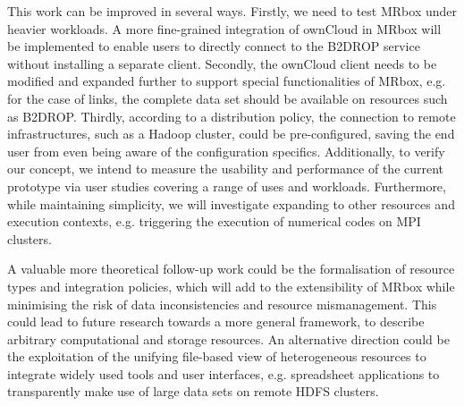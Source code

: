 This work can be improved in several ways. Firstly, we need to test MRbox under heavier workloads. A more fine-grained integration of ownCloud in MRbox will be implemented to enable users to directly connect to the B2DROP service without installing a separate client. Secondly, the ownCloud client needs to be modified and expanded further to support special functionalities of MRbox, e.g. for the case of links, the complete data set should be available on resources such as B2DROP. Thirdly, according to a distribution policy, the connection to remote infrastructures, such as a Hadoop cluster, could be pre-configured, saving the end user from even being aware of the configuration specifics. Additionally, to verify our concept, we intend to measure the usability and performance of the current prototype via user studies covering a range of uses and workloads. Furthermore, while maintaining simplicity, we will investigate expanding to other resources and execution contexts, e.g. triggering the execution of numerical codes on MPI clusters. 

A valuable more theoretical follow-up work could be the formalisation of resource types and integration policies, which will add to the extensibility of MRbox while minimising the risk of data inconsistencies and resource mismanagement. This could lead to future research towards a more general framework, to describe arbitrary computational and storage resources. An alternative direction could be the exploitation of the unifying file-based view of heterogeneous resources to integrate widely used tools and user interfaces, e.g. spreadsheet applications to transparently make use of large data sets on remote HDFS clusters.

